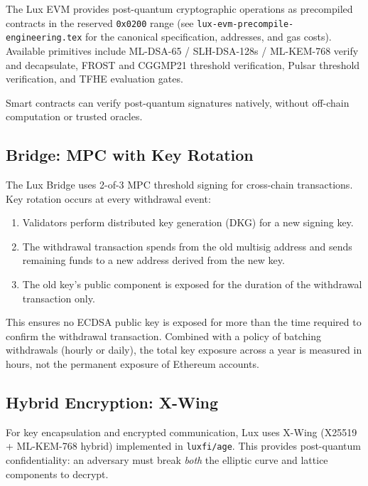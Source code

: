 The Lux EVM provides post-quantum cryptographic operations as
precompiled contracts in the reserved \texttt{0x0200} range (see
\texttt{lux-evm-precompile-engineering.tex} for the canonical
specification, addresses, and gas costs). Available primitives
include ML-DSA-65 / SLH-DSA-128s / ML-KEM-768 verify and decapsulate,
FROST and CGGMP21 threshold verification, Pulsar threshold verification,
and TFHE evaluation gates.

Smart contracts can verify post-quantum signatures natively, without
off-chain computation or trusted oracles.

\subsection{Bridge: MPC with Key Rotation}

The Lux Bridge uses 2-of-3 MPC threshold signing for cross-chain
transactions. Key rotation occurs at every withdrawal event:

\begin{enumerate}[nosep]
  \item Validators perform distributed key generation (DKG) for a new
        signing key.
  \item The withdrawal transaction spends from the old multisig address
        and sends remaining funds to a new address derived from the new
        key.
  \item The old key's public component is exposed for the duration of
        the withdrawal transaction only.
\end{enumerate}

This ensures no ECDSA public key is exposed for more than the time
required to confirm the withdrawal transaction. Combined with a
policy of batching withdrawals (hourly or daily), the total key
exposure across a year is measured in hours, not the permanent
exposure of Ethereum accounts.

\subsection{Hybrid Encryption: X-Wing}

For key encapsulation and encrypted communication, Lux uses X-Wing
(X25519 + ML-KEM-768 hybrid) implemented in \texttt{luxfi/age}. This
provides post-quantum confidentiality: an adversary must break
\emph{both} the elliptic curve and lattice components to decrypt.


